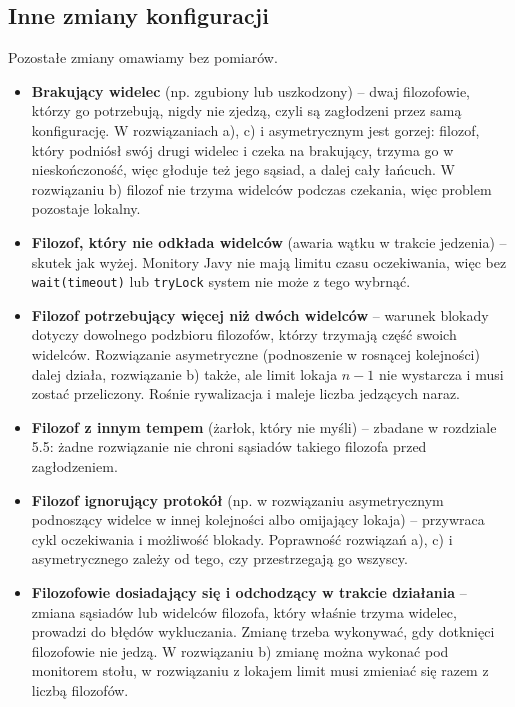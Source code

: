 \documentclass[11pt,a4paper]{article}
\begin{document}
\subsection{Inne zmiany konfiguracji}
Pozostałe zmiany omawiamy bez pomiarów.
\begin{itemize}
    \item \textbf{Brakujący widelec} (np. zgubiony lub uszkodzony) -- dwaj filozofowie, którzy go potrzebują,
          nigdy nie zjedzą, czyli są zagłodzeni przez samą konfigurację. W rozwiązaniach a), c)
          i asymetrycznym jest gorzej: filozof, który podniósł swój drugi widelec i czeka na brakujący,
          trzyma go w nieskończoność, więc głoduje też jego sąsiad, a dalej cały łańcuch.
          W rozwiązaniu b) filozof nie trzyma widelców podczas czekania, więc problem pozostaje lokalny.
    \item \textbf{Filozof, który nie odkłada widelców} (awaria wątku w trakcie jedzenia) -- skutek jak wyżej.
          Monitory Javy nie mają limitu czasu oczekiwania, więc bez \texttt{wait(timeout)} lub \texttt{tryLock}
          system nie może z tego wybrnąć.
    \item \textbf{Filozof potrzebujący więcej niż dwóch widelców} -- warunek blokady dotyczy dowolnego
          podzbioru filozofów, którzy trzymają część swoich widelców. Rozwiązanie asymetryczne
          (podnoszenie w rosnącej kolejności) dalej działa, rozwiązanie b) także,
          ale limit lokaja $n - 1$ nie wystarcza i musi zostać przeliczony. Rośnie rywalizacja
          i maleje liczba jedzących naraz.
    \item \textbf{Filozof z innym tempem} (żarłok, który nie myśli) -- zbadane w rozdziale 5.5:
          żadne rozwiązanie nie chroni sąsiadów takiego filozofa przed zagłodzeniem.
    \item \textbf{Filozof ignorujący protokół} (np. w rozwiązaniu asymetrycznym podnoszący widelce w innej
          kolejności albo omijający lokaja) -- przywraca cykl oczekiwania i możliwość blokady.
          Poprawność rozwiązań a), c) i asymetrycznego zależy od tego, czy przestrzegają go wszyscy.
    \item \textbf{Filozofowie dosiadający się i odchodzący w trakcie działania} -- zmiana sąsiadów lub widelców
          filozofa, który właśnie trzyma widelec, prowadzi do błędów wykluczania. Zmianę trzeba
          wykonywać, gdy dotknięci filozofowie nie jedzą. W rozwiązaniu b) zmianę można wykonać pod monitorem
          stołu, w rozwiązaniu z lokajem limit musi zmieniać się razem z liczbą filozofów.
\end{itemize}
\end{document}

